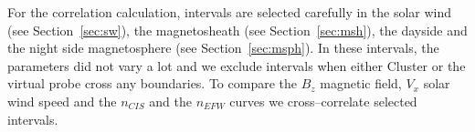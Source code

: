 \documentclass[b5paper,10pt]{article}
\begin{document}
For the correlation calculation, intervals are selected carefully in the solar wind (see Section~\ref{sec:sw}), the magnetosheath (see Section~\ref{sec:msh}), the dayside and the night side magnetosphere (see Section~\ref{sec:msph}). In these intervals, the parameters did not vary a lot and we exclude intervals when either Cluster or the virtual probe cross any boundaries. To compare the $B_z$ magnetic field, $V_x$ solar wind speed and the $n_{CIS}$ and the $n_{EFW}$ curves we cross--correlate selected intervals. %

\end{document}
